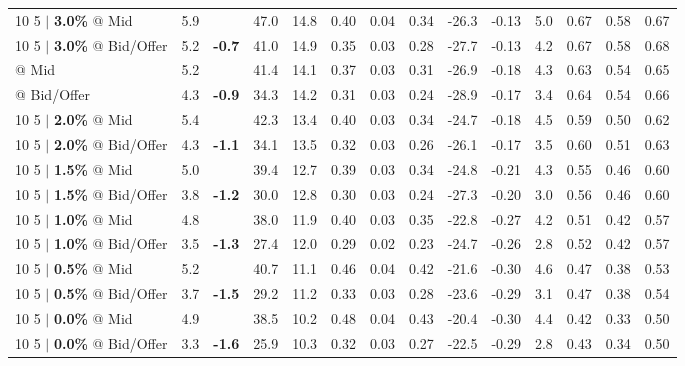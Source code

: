 \documentclass{beamer}
\begin{document}
\begin{frame}
\begin{table}
{\begin{tabular}{lrcrrrrrrrrrrr}
\midrule

\addlinespace
{10 5 $|$ \bf 3.0\%} @ Mid & 5.9 & & 47.0 & 14.8 & 0.40 & 0.04 & 0.34 & -26.3 & -0.13 & 5.0 & 0.67 & 0.58 & 0.67\\
{10 5 $|$ \bf 3.0\%} @ Bid/Offer & 5.2 & {\bf \color{red}-0.7} & 41.0 & 14.9 & 0.35 & 0.03 & 0.28 & -27.7 & -0.13 & 4.2 & 0.67 & 0.58 & 0.68\\
\addlinespace
\color{blue}{10 5 $|$ \bf 2.5\%} @ Mid & 5.2 & & 41.4 & 14.1 & 0.37 & 0.03 & 0.31 & -26.9 & -0.18 & 4.3 & 0.63 & 0.54 & 0.65\\
\color{blue}{10 5 $|$ \bf 2.5\%} @ Bid/Offer & 4.3 & {\bf \color{red}-0.9} & 34.3 & 14.2 & 0.31 & 0.03 & 0.24 & -28.9 & -0.17 & 3.4 & 0.64 & 0.54 & 0.66\\
\addlinespace
{10 5 $|$ \bf 2.0\%} @ Mid & 5.4 & & 42.3 & 13.4 & 0.40 & 0.03 & 0.34 & -24.7 & -0.18 & 4.5 & 0.59 & 0.50 & 0.62\\
{10 5 $|$ \bf 2.0\%} @ Bid/Offer & 4.3 & {\bf \color{red}-1.1} & 34.1 & 13.5 & 0.32 & 0.03 & 0.26 & -26.1 & -0.17 & 3.5 & 0.60 & 0.51 & 0.63\\
\addlinespace
{10 5 $|$ \bf 1.5\%} @ Mid & 5.0 & & 39.4 & 12.7 & 0.39 & 0.03 & 0.34 & -24.8 & -0.21 & 4.3 & 0.55 & 0.46 & 0.60\\
{10 5 $|$ \bf 1.5\%} @ Bid/Offer & 3.8 & {\bf \color{red}-1.2} & 30.0 & 12.8 & 0.30 & 0.03 & 0.24 & -27.3 & -0.20 & 3.0 & 0.56 & 0.46 & 0.60\\
\addlinespace
{10 5 $|$ \bf 1.0\%} @ Mid & 4.8 & & 38.0 & 11.9 & 0.40 & 0.03 & 0.35 & -22.8 & -0.27 & 4.2 & 0.51 & 0.42 & 0.57\\
{10 5 $|$ \bf 1.0\%} @ Bid/Offer & 3.5 & {\bf \color{red}-1.3} & 27.4 & 12.0 & 0.29 & 0.02 & 0.23 & -24.7 & -0.26 & 2.8 & 0.52 & 0.42 & 0.57\\
\addlinespace
{10 5 $|$ \bf 0.5\%} @ Mid & 5.2 & & 40.7 & 11.1 & 0.46 & 0.04 & 0.42 & -21.6 & -0.30 & 4.6 & 0.47 & 0.38 & 0.53\\
{10 5 $|$ \bf 0.5\%} @ Bid/Offer & 3.7 & {\bf \color{red}-1.5} & 29.2 & 11.2 & 0.33 & 0.03 & 0.28 & -23.6 & -0.29 & 3.1 & 0.47 & 0.38 & 0.54\\
\addlinespace
{10 5 $|$ \bf 0.0\%} @ Mid & 4.9 & & 38.5 & 10.2 & 0.48 & 0.04 & 0.43 & -20.4 & -0.30 & 4.4 & 0.42 & 0.33 & 0.50\\
{10 5 $|$ \bf 0.0\%} @ Bid/Offer & 3.3 & {\bf \color{red}-1.6} & 25.9 & 10.3 & 0.32 & 0.03 & 0.27 & -22.5 & -0.29 & 2.8 & 0.43 & 0.34 & 0.50\\
\bottomrule
\end{tabular}
}
\end{table}
\end{frame}
\end{document}
